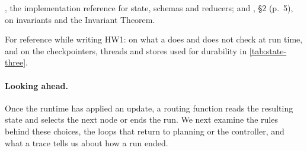 \citet{langgraph-graph-api}, the implementation reference for state, schemas and
reducers; and \citet{mit6042-lec16}, \S2
(p.~5), on invariants and the Invariant Theorem.

For reference while writing HW1: \citet{pep589} on what a  does and does not
check at run time, and \citet{langgraph-persistence} on the checkpointers, threads and stores used
for durability in \cref{tab:state-three}.

\paragraph{Looking ahead.} Once the runtime has applied an update, a routing function reads the
resulting state and selects the next node or ends the run. We next examine the rules behind
these choices, the loops that return to planning or the controller, and what a trace tells us
about how a run ended.
